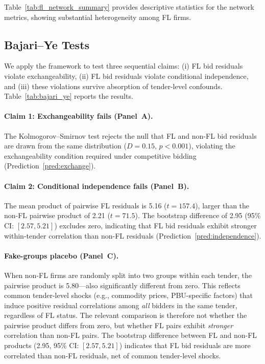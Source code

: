 

Table~\ref{tab:fl_network_summary} provides descriptive statistics for
the network metrics, showing substantial heterogeneity among FL firms.



\subsection{Bajari--Ye Tests}
\label{sec:results_bajari}

We apply the \citet{bajari2003deciding} framework to test three
sequential claims: (i) FL bid residuals violate exchangeability,
(ii) FL bid residuals violate conditional independence, and
(iii) these violations survive absorption of tender-level confounds.
Table~\ref{tab:bajari_ye} reports the results.



\paragraph{Claim 1: Exchangeability fails (Panel~A).}
The Kolmogorov--Smirnov test rejects the null that FL and
non-FL bid residuals are drawn from the same distribution
($D = 0.15$, $p < 0.001$), violating the exchangeability condition
required under competitive bidding (Prediction~\ref{pred:exchange}).

\paragraph{Claim 2: Conditional independence fails (Panel~B).}
The mean product of pairwise FL residuals is 5.16 ($t = 157.4$),
larger than the non-FL pairwise product of 2.21 ($t = 71.5$). The
bootstrap difference of 2.95 (95\% CI: $[2.57, 5.21]$) excludes zero,
indicating that FL bid residuals exhibit stronger within-tender
correlation than non-FL residuals
(Prediction~\ref{pred:independence}).

\paragraph{Fake-groups placebo (Panel~C).}
When non-FL firms are randomly split into two groups within each tender,
the pairwise product is 5.80---also significantly different from zero.
This reflects common tender-level shocks (e.g., commodity prices,
PBU-specific factors) that induce positive residual correlations among
\emph{all} bidders in the same tender, regardless of FL status. The
relevant comparison is therefore not whether the pairwise product differs
from zero, but whether FL pairs exhibit \emph{stronger} correlation than
non-FL pairs. The bootstrap difference between FL and non-FL products
(2.95, 95\% CI: $[2.57, 5.21]$) indicates that FL bid residuals are
more correlated than non-FL residuals, net of common tender-level shocks.

